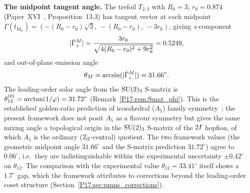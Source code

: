 \begin{remark}
\textbf{The midpoint tangent angle.}
The trefoil $T_{2,3}$ with $R_0=3$, $r_0=0.874$
(Paper~XVI~\cite{Paper16}, Proposition~13.3) has
tangent vector at each midpoint
$\dot\Gamma(t_{\mathrm{M}_n}) = (-(R_0{-}r_0)\sqrt{3},\,-(R_0{-}r_0),\,-3r_0)$,
giving $z$-component
\begin{equation}
  |\dot\Gamma_z^M| = \frac{3r_0}{\sqrt{4(R_0-r_0)^2+9r_0^2}} = 0.5249,
  \label{P17:eq:tang_z_M}
\end{equation}
and out-of-plane emission angle
\begin{equation}
  \theta_M = \arcsin(|\dot\Gamma_z^M|) = 31.66^\circ.
  \label{P17:eq:theta_M}
\end{equation}
The leading-order solar angle from the $\mathrm{SU}(2)_3$ S-matrix is
$\theta_{12}^{(0)}=\arctan(1/\varphi)=31.72^\circ$
(Remark~\ref{P17:rem:Smat_phi}).  This is the established golden-ratio
prediction of icosahedral ($A_5$) family symmetry~\cite{Everett2009};
the present framework does not posit $A_5$ as a flavour symmetry but gives
the same mixing angle a topological origin in the $\mathrm{SU}(2)_3$ S-matrix of
the $2I$ hopfion, of which $A_5$ is the ordinary ($\mathbb{Z}_2$-central)
quotient.  The two framework values (the
geometric midpoint angle $31.66^\circ$ and the S-matrix prediction
$31.72^\circ$) agree to $0.06^\circ$, i.e.\ they are
indistinguishable within the experimental uncertainty
$\pm0.42^\circ$ on $\theta_{12}$.  The comparison with the
experimental value $\theta_{12}=33.41^\circ$ itself shows a
$1.7^\circ$ gap, which the framework attributes to corrections
beyond the leading-order coset structure
(Section~\ref{P17:sec:pmns_corrections}).


\end{remark}
